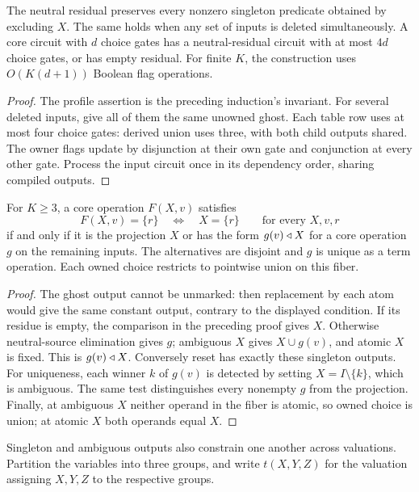 \begin{corollary}\label{core:cor:residual-compiler}
The neutral residual preserves every nonzero singleton predicate obtained
by excluding $X$. The same holds when any set of inputs is deleted
simultaneously. A core circuit with $d$ choice gates has a neutral-residual
circuit with at most $4d$ choice gates, or has empty residual. For finite
$K$, the construction uses $O(K(d+1))$ Boolean flag operations.
\end{corollary}
\begin{proof}
The profile assertion is the preceding induction's invariant. For several
deleted inputs, give all of them the same unowned ghost. Each table row
uses at most four choice gates: derived union uses three, with both child
outputs shared. The owner flags update by disjunction at their own gate
and conjunction at every other gate. Process the input circuit once in
its dependency order, sharing compiled outputs.
\end{proof}

\begin{theorem}\label{core:thm:projection-fiber}
For $K\geq3$, a core operation $F(X,v)$ satisfies
\[
 F(X,v)=\{r\}\quad\Longleftrightarrow\quad X=\{r\}
 \qquad\text{for every }X,v,r
\]
if and only if it is the projection $X$ or has the form
$g(v)\mathbin{\triangleleft} X$ for a core operation $g$ on the remaining inputs.
The alternatives are disjoint and $g$ is unique as a term operation.
Each owned choice restricts to pointwise union on this fiber.
\end{theorem}
\begin{proof}
The ghost output cannot be unmarked: then replacement by each atom
would give the same constant output, contrary to the displayed condition.
If its residue is empty, the comparison in the preceding proof gives $X$.
Otherwise neutral-source elimination gives $g$; ambiguous $X$ gives
$X\cup g(v)$, and atomic $X$ is fixed. This is $g(v)\mathbin{\triangleleft} X$.
Conversely reset has exactly these singleton outputs.
For uniqueness, each winner $k$ of $g(v)$ is detected by setting
$X=I\setminus\{k\}$, which is ambiguous. The same test distinguishes
every nonempty $g$ from the projection.
Finally, at ambiguous $X$ neither operand in the fiber is atomic, so
owned choice is union; at atomic $X$ both operands equal $X$.
\end{proof}



Singleton and ambiguous outputs also constrain one another across
valuations. Partition the variables into
three groups, and write $t(X,Y,Z)$ for the valuation assigning $X,Y,Z$
to the respective groups.


